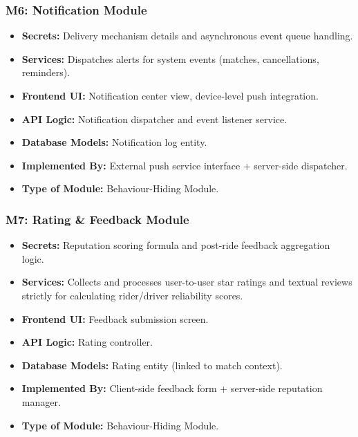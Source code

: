 \subsubsection*{M6: Notification Module}
\begin{itemize}
  \item \textbf{Secrets:} Delivery mechanism details and asynchronous event queue handling.
  \item \textbf{Services:} Dispatches alerts for system events (matches, cancellations, reminders).
  \item \textbf{Frontend UI:} Notification center view, device-level push integration.
  \item \textbf{API Logic:} Notification dispatcher and event listener service.
  \item \textbf{Database Models:} Notification log entity.
  \item \textbf{Implemented By:} External push service interface + server-side dispatcher.
  \item \textbf{Type of Module:} Behaviour-Hiding Module.
\end{itemize}

\subsubsection*{M7: Rating \& Feedback Module}
\begin{itemize}
  \item \textbf{Secrets:} Reputation scoring formula and post-ride feedback aggregation logic.
  \item \textbf{Services:} Collects and processes user-to-user star ratings and textual reviews strictly for calculating rider/driver reliability scores.
  \item \textbf{Frontend UI:} Feedback submission screen.
  \item \textbf{API Logic:} Rating controller.
  \item \textbf{Database Models:} Rating entity (linked to match context).
  \item \textbf{Implemented By:} Client-side feedback form + server-side reputation manager.
  \item \textbf{Type of Module:} Behaviour-Hiding Module.
\end{itemize}

